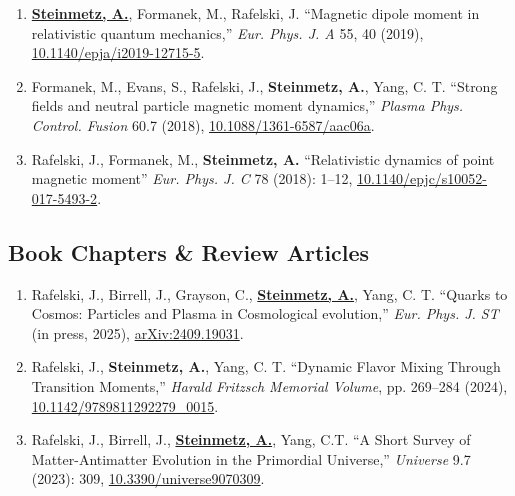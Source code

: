 \documentclass[11pt]{article}
\begin{document}
\begin{enumerate}[leftmargin=*,nosep]
    \item \textbf{\href{https://github.com/ajsteinmetz/magnetic-dipole-moment}{Steinmetz, A.}}, Formanek, M., Rafelski, J. ``Magnetic dipole moment in relativistic quantum mechanics,'' \textit{Eur. Phys. J. A} 55, 40 (2019), \href{https://doi.org/10.1140/epja/i2019-12715-5}{10.1140/epja/i2019-12715-5}.
    \item Formanek, M., Evans, S., Rafelski, J., \textbf{Steinmetz, A.}, Yang, C. T. ``Strong fields and neutral particle magnetic moment dynamics,'' \textit{Plasma Phys. Control. Fusion} 60.7 (2018), \href{https://doi.org/10.1088/1361-6587/aac06a}{10.1088/1361-6587/aac06a}.
    \item Rafelski, J., Formanek, M., \textbf{Steinmetz, A.} ``Relativistic dynamics of point magnetic moment'' \textit{Eur. Phys. J. C} 78 (2018): 1--12, \href{https://doi.org/10.1140/epjc/s10052-017-5493-2}{10.1140/epjc/s10052-017-5493-2}.
\end{enumerate}

\subsection*{Book Chapters \& Review Articles}
\begin{enumerate}[leftmargin=*,nosep]
    \item Rafelski, J., Birrell, J., Grayson, C., \textbf{\href{https://github.com/ajsteinmetz/thesis-collab-project}{Steinmetz, A.}}, Yang, C. T. ``Quarks to Cosmos: Particles and Plasma in Cosmological evolution,'' \textit{Eur. Phys. J. ST} (in press, 2025), \href{https://doi.org/10.48550/arXiv.2409.19031}{arXiv:2409.19031}.
    \item Rafelski, J., \textbf{Steinmetz, A.}, Yang, C. T. ``Dynamic Flavor Mixing Through Transition Moments,'' \textit{Harald Fritzsch Memorial Volume}, pp. 269--284 (2024), \href{https://doi.org/10.1142/9789811292279_0015}{10.1142/9789811292279\_0015}.
    \item Rafelski, J., Birrell, J., \textbf{\href{https://github.com/ajsteinmetz/a-short-survey}{Steinmetz, A.}}, Yang, C.T. ``A Short Survey of Matter-Antimatter Evolution in the Primordial Universe,'' \textit{Universe} 9.7 (2023): 309, \href{https://doi.org/10.3390/universe9070309}{10.3390/universe9070309}.
\end{enumerate}
\end{document}
